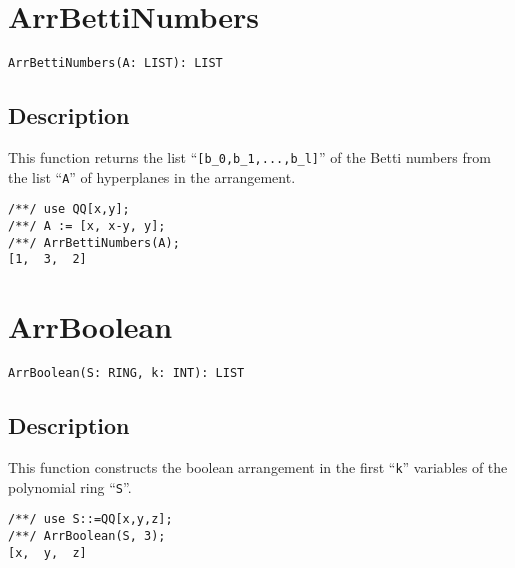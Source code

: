 \documentclass[a4paper]{mybook}
\newenvironment{command}{}{} %
\begin{document}
\section{ArrBettiNumbers}
\label{ArrBettiNumbers}
\begin{command} %


\begin{Verbatim}[label=syntax, rulecolor=\color{MidnightBlue},
frame=single]
ArrBettiNumbers(A: LIST): LIST 
\end{Verbatim}


\subsection*{Description}

This function returns the list ``\verb&[b_0,b_1,...,b_l]&'' of the Betti numbers
from the list ``\verb&A&'' of hyperplanes in the arrangement.
\begin{Verbatim}[label=example, rulecolor=\color{PineGreen}, frame=single]
/**/ use QQ[x,y];	
/**/ A := [x, x-y, y];
/**/ ArrBettiNumbers(A);
[1,  3,  2]
\end{Verbatim}


\end{command} %

\section{ArrBoolean}
\label{ArrBoolean}
\begin{command} %


\begin{Verbatim}[label=syntax, rulecolor=\color{MidnightBlue},
frame=single]
ArrBoolean(S: RING, k: INT): LIST 
\end{Verbatim}


\subsection*{Description}

This function constructs the boolean arrangement in the first ``\verb&k&''
variables of the polynomial ring ``\verb&S&''.
\begin{Verbatim}[label=example, rulecolor=\color{PineGreen}, frame=single]
/**/ use S::=QQ[x,y,z];	
/**/ ArrBoolean(S, 3);
[x,  y,  z]
\end{Verbatim}


\end{command} %
\end{document}
